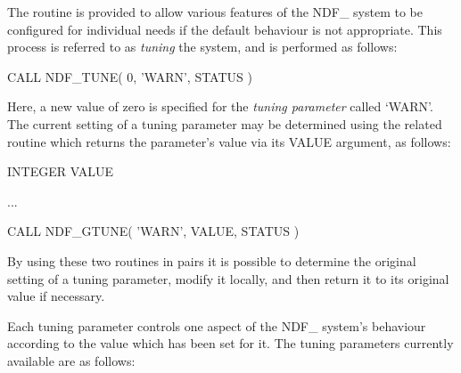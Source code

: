 \documentclass[twoside,11pt,nolof]{starlink}
\providecommand{\st}[1]{{\emph{#1}}}
\begin{document}
The routine  is provided to allow various features of the
NDF\_ system to be configured for individual needs if the default
behaviour is not appropriate.  This process is referred to as
\st{tuning} the system, and is performed as follows:

\small
\begin{terminalv}
      CALL NDF_TUNE( 0, 'WARN', STATUS )
\end{terminalv}
\normalsize

Here, a new value of zero is specified for the \st{tuning parameter}
called `WARN'. The current setting of a tuning parameter may be
determined using the related routine  which returns the
parameter's value via its VALUE argument, as follows:

\small
\begin{terminalv}
      INTEGER VALUE

      ...

      CALL NDF_GTUNE( 'WARN', VALUE, STATUS )
\end{terminalv}
\normalsize

By using these two routines in pairs it is possible to determine the original
setting of a tuning parameter, modify it locally, and then return it to its
original value if necessary.

Each tuning parameter controls one aspect of the NDF\_ system's
behaviour according to the value which has been set for it. The tuning
parameters currently available are as follows:
\end{document}
